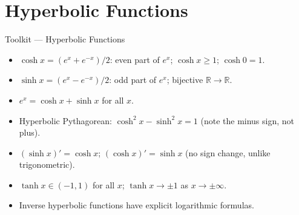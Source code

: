\section{Hyperbolic Functions}

\begin{toolkitbox}{Toolkit --- Hyperbolic Functions}
\begin{itemize}
  \item $\cosh x = (e^x + e^{-x})/2$: even part of $e^x$;\;
    $\cosh x \geq 1$;\; $\cosh 0 = 1$.
  \item $\sinh x = (e^x - e^{-x})/2$: odd part of $e^x$;\;
    bijective $\mathbb{R} \to \mathbb{R}$.
  \item $e^x = \cosh x + \sinh x$ for all $x$.
  \item Hyperbolic Pythagorean: $\cosh^2 x - \sinh^2 x = 1$
    (note the minus sign, not plus).
  \item $(\sinh x)' = \cosh x$;\; $(\cosh x)' = \sinh x$
    (no sign change, unlike trigonometric).
  \item $\tanh x \in (-1,1)$ for all $x$;\;
    $\tanh x \to \pm 1$ as $x \to \pm\infty$.
  \item Inverse hyperbolic functions have explicit logarithmic formulas.
\end{itemize}
\end{toolkitbox}


